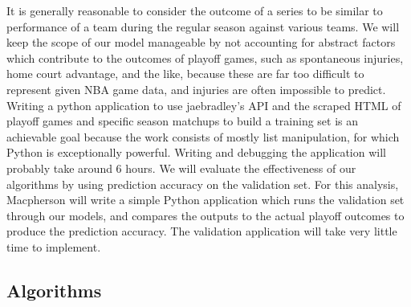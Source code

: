 \documentclass[letterpaper]{article} %
\begin{document}
It is generally reasonable to consider the outcome of a series to be similar to performance of a team during the regular season against various teams. We will keep the scope of our model manageable by not accounting for abstract factors which contribute to the outcomes of playoff games, such as spontaneous injuries, home court advantage, and the like, because these are far too difficult to represent given NBA game data, and injuries are often impossible to predict. Writing a python application to use jaebradley’s API and the scraped HTML of playoff games and specific season matchups to build a training set is an achievable goal because the work consists of mostly list manipulation, for which Python is exceptionally powerful. Writing and debugging the application will probably take around 6 hours. We will evaluate the effectiveness of our algorithms by using prediction accuracy on the validation set. For this analysis, Macpherson will write a simple Python application which runs the validation set through our models, and compares the outputs to the actual playoff outcomes to produce the prediction accuracy. The validation application will take very little time to implement.

\subsection{Algorithms}
\end{document}
